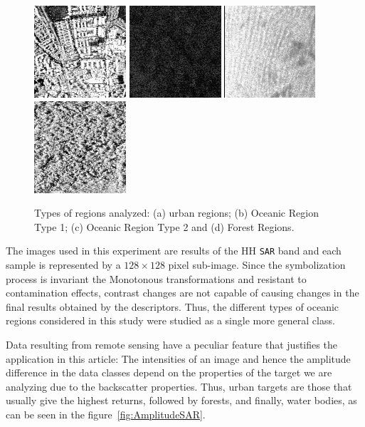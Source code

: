 \documentclass{isprs}
\begin{document}
\begin{figure}[hbt]
	\centering
	\includegraphics[width=.23\linewidth]{Figures/munichUrban.png}
	\includegraphics[width=.23\linewidth]{Figures/Cape1.png}
	\includegraphics[width=.23\linewidth]{Figures/Cape2.png}
	\includegraphics[width=.23\linewidth]{Figures/guatemalaflorest.png}
	\caption{Types of regions analyzed: (a) urban regions; (b) Oceanic Region Type 1; (c) Oceanic Region Type 2 and (d) Forest Regions.}\label{fig:RegioesSAR}
\end{figure} 
	
The images used in this experiment are results of the HH \texttt{SAR} band and each sample is represented by a $128 \times 128$ pixel sub-image.
Since the symbolization process is invariant the Monotonous transformations and resistant to contamination effects, contrast changes are not capable of causing changes in the final results obtained by the descriptors.
Thus, the different types of oceanic regions considered in this study were studied as a single more general class.
	
Data resulting from remote sensing have a peculiar feature that justifies the application in this article:
The intensities of an image and hence the amplitude difference in the data classes depend on the properties of the target we are analyzing due to the backscatter properties.
Thus, urban targets are those that usually give the highest returns, followed by forests, and finally, water bodies, as can be seen in the figure~\ref{fig:AmplitudeSAR}.
	
\end{document}
